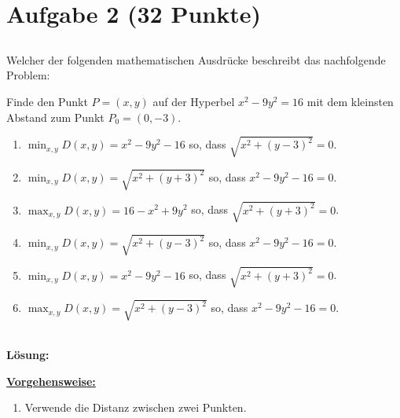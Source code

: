 \section*{Aufgabe 2 (32 Punkte)}
\vspace{0.4cm}
\subsection*{}
Welcher der folgenden mathematischen Ausdrücke beschreibt das nachfolgende Problem:
\begin{displayquote}
	Finde den Punkt $P = (x,y)$ auf der Hyperbel $x^2 - 9 y^2 = 16$ mit dem kleinsten
	Abstand zum Punkt $P_0 = (0,-3)$.
\end{displayquote}
\renewcommand{\labelenumi}{(\alph{enumi})}
\begin{enumerate}
	\item 
	$\min_{x,y} D(x,y) = x^2 - 9y^2 - 16$ so, dass
	$\sqrt{x^2 + (y-3)^2} = 0$.
	\item 
	$\min_{x,y} D(x,y) = \sqrt{x^2 + ( y + 3)^2}$ so, dass
	$x^2 - 9 y^2 - 16  = 0$.
	\item 
	$\max_{x,y} D(x,y) = 16 - x^2 + 9y^2 $ so, dass
	$\sqrt{x^2 + (y+3)^2} = 0$.
	\item 
	$\min_{x,y} D(x,y) = \sqrt{x^2 + ( y - 3)^2}$ so, dass
	$x^2 - 9 y^2 - 16  = 0$.
	\item 
	$\min_{x,y} D(x,y) = x^2 - 9y^2 - 16$ so, dass
	$\sqrt{x^2 + (y+3)^2} = 0$.
	\item
	$\max_{x,y} D(x,y) = \sqrt{x^2 + ( y - 3)^2}$ so, dass
	$x^2 - 9 y^2 - 16  = 0$.
\end{enumerate}
\ \\
\textbf{Lösung:}
\begin{mdframed}
\underline{\textbf{Vorgehensweise:}}
\renewcommand{\labelenumi}{\theenumi.}
\begin{enumerate}
\item Verwende die Distanz zwischen zwei Punkten.
\end{enumerate}
\end{mdframed}

